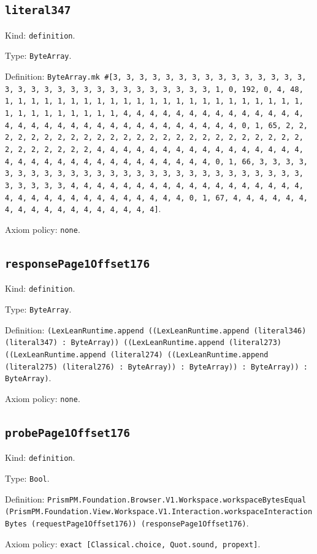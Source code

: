 \documentclass[11pt]{article}
\begin{document}
\subsection*{\texttt{literal347}}
\noindent Kind: \texttt{definition}.\par
\noindent Type: \texttt{ByteArray}.\par
\noindent Definition: \texttt{ByteArray.mk \#[3, 3, 3, 3, 3, 3, 3, 3, 3, 3, 3, 3, 3, 3, 3, 3, 3, 3, 3, 3, 3, 3, 3, 3, 3, 3, 3, 3, 3, 3, 3, 1, 0, 192, 0, 4, 48, 1, 1, 1, 1, 1, 1, 1, 1, 1, 1, 1, 1, 1, 1, 1, 1, 1, 1, 1, 1, 1, 1, 1, 1, 1, 1, 1, 1, 1, 1, 1, 1, 4, 4, 4, 4, 4, 4, 4, 4, 4, 4, 4, 4, 4, 4, 4, 4, 4, 4, 4, 4, 4, 4, 4, 4, 4, 4, 4, 4, 4, 4, 4, 4, 0, 1, 65, 2, 2, 2, 2, 2, 2, 2, 2, 2, 2, 2, 2, 2, 2, 2, 2, 2, 2, 2, 2, 2, 2, 2, 2, 2, 2, 2, 2, 2, 2, 2, 2, 4, 4, 4, 4, 4, 4, 4, 4, 4, 4, 4, 4, 4, 4, 4, 4, 4, 4, 4, 4, 4, 4, 4, 4, 4, 4, 4, 4, 4, 4, 4, 4, 0, 1, 66, 3, 3, 3, 3, 3, 3, 3, 3, 3, 3, 3, 3, 3, 3, 3, 3, 3, 3, 3, 3, 3, 3, 3, 3, 3, 3, 3, 3, 3, 3, 3, 3, 4, 4, 4, 4, 4, 4, 4, 4, 4, 4, 4, 4, 4, 4, 4, 4, 4, 4, 4, 4, 4, 4, 4, 4, 4, 4, 4, 4, 4, 4, 4, 4, 0, 1, 67, 4, 4, 4, 4, 4, 4, 4, 4, 4, 4, 4, 4, 4, 4, 4, 4, 4, 4]}.\par
\noindent Axiom policy: \texttt{none}.\par
\subsection*{\texttt{responsePage1Offset176}}
\noindent Kind: \texttt{definition}.\par
\noindent Type: \texttt{ByteArray}.\par
\noindent Definition: \texttt{(LexLeanRuntime.append ((LexLeanRuntime.append (literal346) (literal347) : ByteArray)) ((LexLeanRuntime.append (literal273) ((LexLeanRuntime.append (literal274) ((LexLeanRuntime.append (literal275) (literal276) : ByteArray)) : ByteArray)) : ByteArray)) : ByteArray)}.\par
\noindent Axiom policy: \texttt{none}.\par
\subsection*{\texttt{probePage1Offset176}}
\noindent Kind: \texttt{definition}.\par
\noindent Type: \texttt{Bool}.\par
\noindent Definition: \texttt{PrismPM.Foundation.Browser.V1.Workspace.workspaceBytesEqual (PrismPM.Foundation.View.Workspace.V1.Interaction.workspaceInteractionBytes (requestPage1Offset176)) (responsePage1Offset176)}.\par
\noindent Axiom policy: \texttt{exact [Classical.choice, Quot.sound, propext]}.\par
\end{document}
